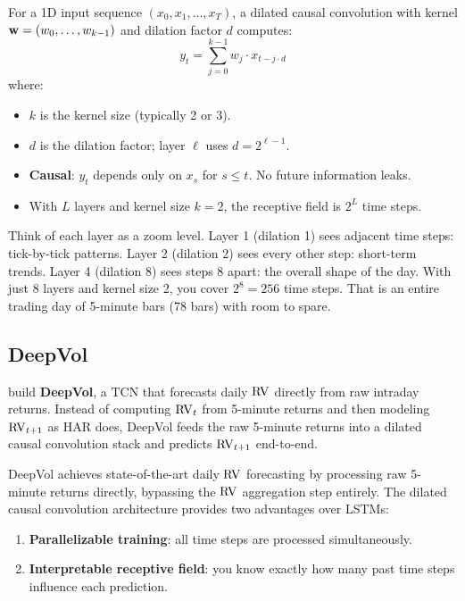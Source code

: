 \begin{definition}
For a 1D input sequence $(x_0, x_1, \ldots, x_T)$, a dilated causal convolution with kernel $\mathbf{w} = (w_0, \ldots, w_{k-1})$ and dilation factor $d$ computes:
\begin{equation}\label{eq:dilated-conv}
  y_t = \sum_{j=0}^{k-1} w_j \cdot x_{t - j \cdot d}
\end{equation}
where:
\begin{itemize}[nosep]
  \item $k$ is the kernel size (typically 2 or 3).
  \item $d$ is the dilation factor; layer $\ell$ uses $d = 2^{\ell-1}$.
  \item \textbf{Causal}: $y_t$ depends only on $x_s$ for $s \le t$. No future information leaks.
  \item With $L$ layers and kernel size $k=2$, the receptive field is $2^L$ time steps.
\end{itemize}
\end{definition}

\begin{intuition}
Think of each layer as a zoom level.
Layer 1 (dilation 1) sees adjacent time steps: tick-by-tick patterns.
Layer 2 (dilation 2) sees every other step: short-term trends.
Layer 4 (dilation 8) sees steps 8 apart: the overall shape of the day.
With just 8 layers and kernel size 2, you cover $2^8 = 256$ time steps.
That is an entire trading day of 5-minute bars (78 bars) with room to spare.
\end{intuition}

\subsection{DeepVol}

\citet{MorenoPinoZohren2022DeepVol} build \textbf{DeepVol}, a TCN that forecasts daily $\operatorname{RV}$ directly from raw intraday returns.
Instead of computing $\operatorname{RV}_t$ from 5-minute returns and then modeling $\operatorname{RV}_{t+1}$ as HAR does, DeepVol feeds the raw 5-minute returns into a dilated causal convolution stack and predicts $\operatorname{RV}_{t+1}$ end-to-end.

\begin{keyresult}
DeepVol achieves state-of-the-art daily $\operatorname{RV}$ forecasting by processing raw 5-minute returns directly, bypassing the $\operatorname{RV}$ aggregation step entirely.
The dilated causal convolution architecture provides two advantages over LSTMs:
\begin{enumerate}[nosep]
  \item \textbf{Parallelizable training}: all time steps are processed simultaneously.
  \item \textbf{Interpretable receptive field}: you know exactly how many past time steps influence each prediction.
\end{enumerate}
\end{keyresult}

